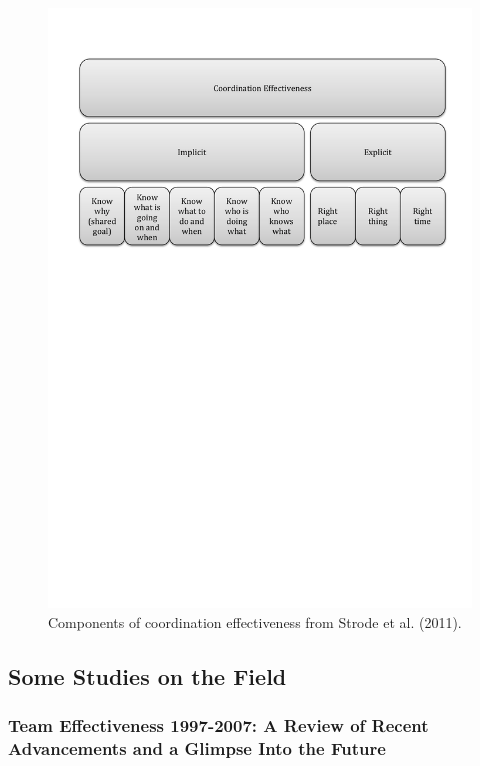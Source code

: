 \begin{figure}[H]
\centering
\includegraphics[trim=0cm 17.5cm 0cm 1.5cm, width=160mm]{images/Coordination_Effectiveness.pdf}
\caption{Components of coordination effectiveness from Strode et al. (2011).}
\label{effectiveness}
\end{figure}

\subsection{Some Studies on the Field}


\subsubsection{Team Effectiveness 1997-2007: A Review of Recent Advancements and a Glimpse Into the Future}

